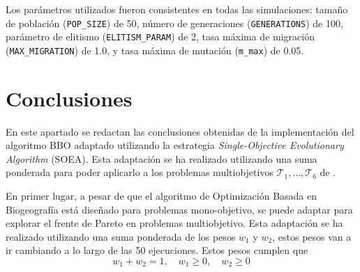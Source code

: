 \documentclass{article}
\begin{document}
Los parámetros utilizados fueron consistentes en todas las simulaciones: tamaño de población (\verb|POP_SIZE|) de 50, número de generaciones (\verb|GENERATIONS|) de 100, parámetro de elitismo (\verb|ELITISM_PARAM|) de 2, tasa máxima de migración (\verb|MAX_MIGRATION|) de 1.0, y tasa máxima de mutación (\verb|m_max|) de 0.05.


\section{Conclusiones}
\label{sec:meta2_Conclusiones}
En este apartado se redactan las conclusiones obtenidas de la implementación del algoritmo BBO adaptado utilizando la estrategia \textit{Single-Objective Evolutionary Algorithm} (SOEA). Esta adaptación se ha realizado utilizando una suma ponderada para poder aplicarlo a los problemas multiobjetivos $\mathcal{T}_1, \ldots, \mathcal{T}_6$ de .

En primer lugar, a pesar de que el algoritmo de Optimización Basada en Biogeografía está diseñado para problemas mono-objetivo, se puede adaptar para explorar el frente de Pareto en problemas multiobjetivo. Esta adaptación se ha realizado utilizando una suma ponderada de los pesos $w_1$ y $w_2$, estos pesos van a ir cambiando a lo largo de las 50 ejecuciones. Estos pesos cumplen que $$w_1 + w_2 = 1, \quad w_1 \ge 0, \quad w_2 \ge 0$$\\
\end{document}
